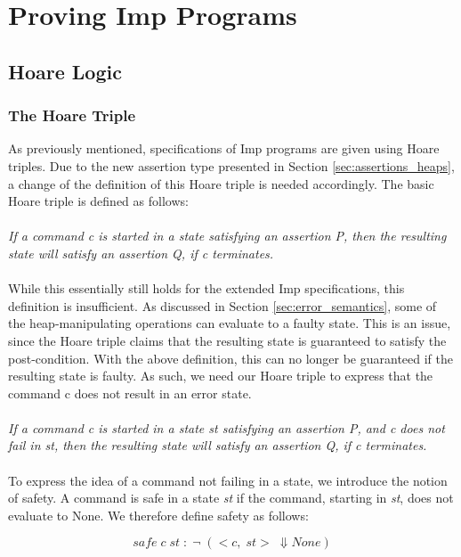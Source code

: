 \section{Proving Imp Programs}
\subsection{Hoare Logic}
\subsubsection{The Hoare Triple}
As previously mentioned, specifications of Imp programs are given using Hoare triples. Due to the new assertion type presented in Section \ref{sec:assertions_heaps}, a change of the definition of this Hoare triple is needed accordingly. The basic Hoare triple is defined as follows:
\\
\\
\textit{If a command c is started in a state satisfying an assertion P, then the resulting state will satisfy an assertion Q, if c terminates.}
\\
\\
While this essentially still holds for the extended Imp specifications, this definition is insufficient. As discussed in Section \ref{sec:error_semantics}, some of the heap-manipulating operations can evaluate to a faulty state. This is an issue, since the Hoare triple claims that the resulting state is guaranteed to satisfy the post-condition. With the above definition, this can no longer be guaranteed if the resulting state is faulty. As such, we need our Hoare triple to  express that the command c does not result in an error state.
\\
\\
\textit{If a command c is started in a state st satisfying an assertion P, and c does not fail in st, then the resulting state will satisfy an assertion Q, if c terminates.}
\\
\\
To express the idea of a command not failing in a state, we introduce the notion of safety. A command is safe in a state {\it st} if the command, starting in {\it st}, does not evaluate to None. We therefore define safety as follows:

\[ \mathit{safe\;c\;st\;: \;\neg \;(<c,\;st>\;\Downarrow None)}\]

